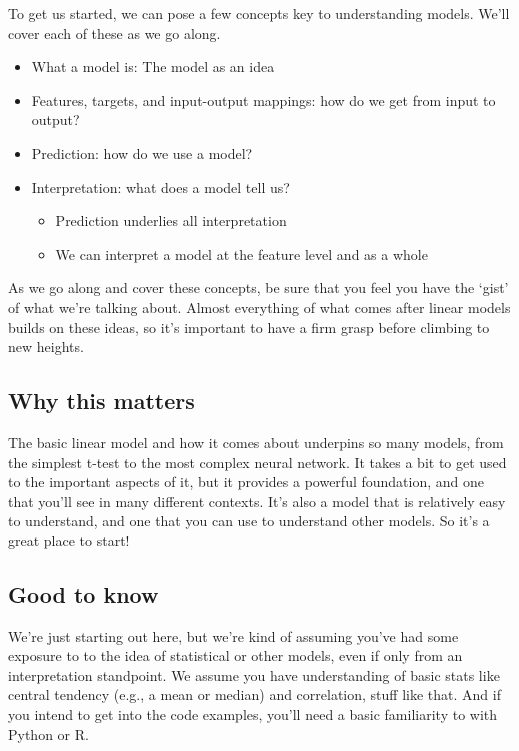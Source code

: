 \documentclass[
  letterpaper,
]{krantz}
\providecommand{\tightlist}{%
  \setlength{\itemsep}{0pt}\setlength{\parskip}{0pt}}\usepackage{longtable,booktabs,array}
\begin{document}
To get us started, we can pose a few concepts key to understanding
models. We'll cover each of these as we go along.

\begin{itemize}
\tightlist
\item
  What a model is: The model as an idea
\item
  Features, targets, and input-output mappings: how do we get from input
  to output?
\item
  Prediction: how do we use a model?
\item
  Interpretation: what does a model tell us?

  \begin{itemize}
  \tightlist
  \item
    Prediction underlies all interpretation
  \item
    We can interpret a model at the feature level and as a whole
  \end{itemize}
\end{itemize}

As we go along and cover these concepts, be sure that you feel you have
the `gist' of what we're talking about. Almost everything of what comes
after linear models builds on these ideas, so it's important to have a
firm grasp before climbing to new heights.

\subsection{Why this matters}\label{sec-lm-why-this-matters}

The basic linear model and how it comes about underpins so many models,
from the simplest t-test to the most complex neural network. It takes a
bit to get used to the important aspects of it, but it provides a
powerful foundation, and one that you'll see in many different contexts.
It's also a model that is relatively easy to understand, and one that
you can use to understand other models. So it's a great place to start!

\subsection{Good to know}\label{sec-lm-good-to-know}

We're just starting out here, but we're kind of assuming you've had some
exposure to to the idea of statistical or other models, even if only
from an interpretation standpoint. We assume you have understanding of
basic stats like central tendency (e.g., a mean or median) and
correlation, stuff like that. And if you intend to get into the code
examples, you'll need a basic familiarity to with Python or R.
\end{document}
